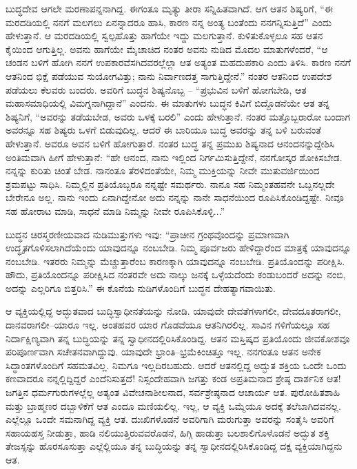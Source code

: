 ಬುದ್ಧದೇವ ಆಗಲೇ ಮರಣಾಪನ್ನನಾಗಿದ್ದ. ಈಗಂತೂ ಮೃತ್ಯು ತೀರಾ ಸನ್ನಿಹಿತವಾಗಿದೆ. ಆಗ ಆತನ ಶಿಷ್ಯರಿಗೆ, “ಈ ಮರದಡಿಯಲ್ಲಿ ನನಗೆ ಮಲಗಲು ಏನನ್ನಾದರೂ ಹಾಸಿ, ಕಾರಣ ನನ್ನ ಅಂತ್ಯ ಬಂತೆಂದು ನನಗನ್ನಿಸುತ್ತಿದೆ” ಎಂದು ಹೇಳುತ್ತಾನೆ. ಆ ಮರದಡಿಯಲ್ಲಿ ಸ್ವಲ್ಪಹೊತ್ತು ಹಾಗೆಯೇ ಇದ್ದು ಮಲಗುತ್ತಾನೆ. ಕುಳಿತುಕೊಳ್ಳಲೂ ಸಹ ಆತನ ಕೈಯಿಂದ ಆಗುತ್ತಿಲ್ಲ. ಅವನು ಹಾಗೆಯೇ ಮೈಚಾಚಿದ ನಂತರ ಅವನು ನುಡಿದ ಮೊದಲ ಮಾತುಗಳೆಂದರೆ, “ಆ ಚಂಡನ ಬಳಿಗೆ ಹೋಗಿ ನನಗೆ ಉಪಕಾರವೆಸಗಿದವರಲ್ಲೆಲ್ಲಾ ಆತ ಅತ್ಯಂತ ಮಹದುಪಕಾರಿ ಎಂದು ತಿಳಿಸಿ. ಕಾರಣ ನನಗೆ ಆತನಿಂದ ಭಿಕ್ಷೆ ಪಡೆಯುವ ಸುಯೋಗವಿತ್ತು; ನಾನು ನಿರ್ವಾಣದತ್ತ ಸಾಗುತ್ತಿದ್ದೇನೆ.” ನಂತರ ಆತನಿಂದ ಉಪದೇಶ ಪಡೆಯಲು ಕೆಲವರು ಬಂದರು. ಅವರಿಗೆ ಬುದ್ಧನ ಶಿಷ್ಯನೊಬ್ಬ – “ಪ್ರಭುವಿನ ಬಳಿಗೆ ಹೋಗಬೇಡಿ, ಆತ ಮಹಾಸಮಾಧಿಯಲ್ಲಿ ವಿಮಗ್ನನಾಗಿದ್ದಾನೆ” ಎಂದನು. ಈ ಮಾತುಗಳು ಬುದ್ಧನ ಕಿವಿಗೆ ಬಿದ್ದೊಡನೆಯೇ ಆತ ತನ್ನ ಶಿಷ್ಯನಿಗೆ, “ಅವರನ್ನು ತಡೆಯಬೇಡ, ಅವರು ಒಳಕ್ಕೆ ಬರಲಿ” ಎಂದು ಹೇಳುತ್ತಾನೆ. ನಂತರ ಮತ್ತೊಬ್ಬರಾರೋ ಬಂದಾಗ ಅವರನ್ನೂ ಸಹ ಶಿಷ್ಯರು ಒಳಗೆ ಬಿಡುವುದಿಲ್ಲ. ಆದರೆ ಈ ಬಾರಿಯೂ ಬುದ್ಧ ಅವರನ್ನು ತನ್ನ ಬಳಿ ಬರುವಂತೆ ಹೇಳುತ್ತಾನೆ. ಅವರೂ ಅವನ ಬಳಿಗೆ ಹೋಗುತ್ತಾರೆ. ನಂತರ ಬುದ್ಧ ತನ್ನ ಪ್ರಮುಖ ಶಿಷ್ಯನಾದ ಆನಂದನನ್ನುದ್ದೇಶಿಸಿ ಅಂತಿಮವಾಗಿ ಹೀಗೆ ಹೇಳುತ್ತಾನೆ: “ಹೇ ಆನಂದ, ನಾನು ಇಲ್ಲಿಂದ ನಿರ್ಗಮಿಸುತ್ತಿದ್ದೇನೆ, ನನಗೋಸ್ಕರ ಶೋಕಿಸಬೇಡ. ನನ್ನನ್ನು ಕುರಿತು ಚಿಂತೆ ಬೇಡ. ನಾನಂತೂ ತೆರಳಿದಂತೆಯೇ, ನಿಮ್ಮ ಮುಕ್ತಿಯನ್ನು ನೀವೇ ಮುತುವರ್ಜಿಯಿಂದ ಶ್ರಮಪಟ್ಟು ಸಾಧಿಸಿ. ನಿಮ್ಮಲ್ಲಿನ ಪ್ರತಿಯೊಬ್ಬರೂ ನನ್ನಷ್ಟೇ ಸಮರ್ಥರು. ನಾನೂ ಸಹ ನಿಮ್ಮಂತಹವನೇ ಒಬ್ಬನಲ್ಲದೇ ಬೇರೇನೂ ಅಲ್ಲ. ನಾನು ಇಂದು ಏನಾಗಿದ್ದೇನೋ ಅದು ನನ್ನನ್ನು ನಾನೇ ಸಾಧನೆಯಿಂದ ರೂಪಿಸಿಕೊಂಡಿದ್ದಷ್ಟೇ. ನೀವೂ ಸಹ ಹೋರಾಟ ಮಾಡಿ, ಸಾಧನೆ ಮಾಡಿ ನಿಮ್ಮನ್ನು ನೀವೇ ರೂಪಿಸಿಕೊಳ್ಳಿ...”

ಬುದ್ಧನ ಚಿರಸ್ಮರಣೀಯವಾದ ನುಡಿಮುತ್ತುಗಳು ಇವು: “ಪ್ರಾಚೀನ ಗ್ರಂಥವೊಂದನ್ನು ಪ್ರಮಾಣವಾಗಿ ಉದ್ಧೃತಗೊಳಿಸಲಾಗಿದೆಯೆಂದು ಯಾವುದನ್ನೂ ನಂಬಬೇಡಿ. ನಿಮ್ಮ ಪೂರ್ವಜರು ಹೇಳಿದ್ದಾರೆಂದ ಮಾತ್ರಕ್ಕೆ ಯಾವುದನ್ನೂ ನಂಬಬೇಡಿ. ಇತರರು ನಿಮ್ಮನ್ನು ಮೆಚ್ಚುತ್ತಾರೆಂಬ ಕಾರಣಕ್ಕಾಗಿ ಯಾವುದನ್ನೂ ನಂಬಬೇಡಿ. ಪ್ರತಿಯೊಂದನ್ನು ಪರೀಕ್ಷಿಸಿ. ಹೌದು, ಪ್ರತಿಯೊಂದನ್ನೂ ಪರೀಕ್ಷಿಸಿದ ನಂತರವೇ ಅದು ನಾಲ್ಕು ಜನಕ್ಕೆ ಒಳ್ಳೆಯದೆಂದು ಕಂಡುಬಂದರೆ ಅದನ್ನು ನಂಬಿ, ಅದನ್ನು ಎಲ್ಲರಿಗೂ ಬಿತ್ತರಿಸಿ.” ಈ ಕೊನೆಯ ನುಡಿಗಳೊಂದಿಗೆ ಬುದ್ಧನ ದೇಹತ್ಯಾಗವಾಯಿತು.

ಆ ವ್ಯಕ್ತಿಯಲ್ಲಿದ್ದ ಅದ್ಭುತವಾದ ಬುದ್ಧಿಸ್ವಾಧೀನತೆಯನ್ನು ನೋಡಿ. ಯಾವುದೇ ದೇವತೆಗಳಾಗಲೀ, ದೇವದೂತರಾಗಲೀ, ದಾನವರಾಗಲೀ–ಯಾರೂ ಇಲ್ಲ. ಅಂತಹವರ ಯಾರ ಗೊಡವೆಯೂ ಆತನಿಗಿರಲಿಲ್ಲ. ಸಾವಿನ ಗಳಿಗೆಯಲ್ಲೂ ಸಹ ನಿರ್ದಾಕ್ಷಿಣ್ಯವಾಗಿ ತನ್ನ ಬುದ್ಧಿಯನ್ನು ತನ್ನ ಸ್ವಾಧೀನದಲ್ಲಿರಿಸಿಕೊಂಡಿದ್ದ. ಆತನ ಮಸ್ತಿಷ್ಕದ ಪ್ರತಿಯೊಂದು ಜೀವಕೋಶವೂ ಪರಿಪೂರ್ಣವಾಗಿ ಸಚೇತನವಾಗಿದ್ದುವು. ಯಾವುದೇ ಭ್ರಾಂತಿ–ಭ್ರಮೆಕಿಂಚಿತ್ತೂ ಇಲ್ಲ. ನನಗಂತೂ ಆತನ ಅನೇಕ ಸಿದ್ಧಾಂತಗಳೊಂದಿಗೆ ಸಹಮತವಿಲ್ಲ. ನಿಮಗೂ ಇಲ್ಲದಿರಬಹುದು. ಆದರೆ ಆತನಲ್ಲಿದ್ದ ಅದ್ಭುತ ಶಕ್ತಿಯ ಒಂದೇ ಒಂದು ಕಣವಾದರೂ ನನ್ನಲ್ಲಿದ್ದಿದ್ದರೆ ಎಂದೆನಿಸುತ್ತದೆ! ನಿಸ್ಸಂದೇಹವಾಗಿ ಜಗತ್ತು ಕಂಡ ಅಪ್ರತಿಮನಾದ ಶ್ರೇಷ್ಠ ದಾರ್ಶನಿಕ ಆತ! ಜಗತ್ತಿನ ಧರ್ಮಗುರುಗಳಲ್ಲೆಲ್ಲ ಅತ್ಯಂತ ವಿವೇಚನಾಶೀಲನಾದ, ಸರ್ವಶ್ರೇಷ್ಠನಾದ ಆಚಾರ್ಯ ಆತ. ಪುರೋಹಿತಶಾಹಿ ಮತ್ತು ಬ್ರಾಹ್ಮಣರ ದಬ್ಬಾಳಿಕೆಗೆ ಆತ ಎಂದೂ ಮಣಿಯಲಿಲ್ಲ. ಇಲ್ಲ, ಆ ವ್ಯಕ್ತಿ ಒಮ್ಮೆಯೂ ಅದಕ್ಕೆ ತಲೆಬಾಗಿದವನಲ್ಲ. ಎಲ್ಲೆಲ್ಲೂ ಒಂದೇ ಸಮನಾಗಿದ್ದ ವ್ಯಕ್ತಿ ಆತ. ದುಃಖಿಗಳೊಡನೆ ಅವರಿಗಾಗಿ ಮರುಗುತ್ತಾ ಅವರನ್ನು ಸಂತೈಸಿ ಅವರಿಗೆ ಸಹಾಯಹಸ್ತ ನೀಡುತ್ತಾ, ಹಾಡಿ ನಲಿಯುತ್ತಿರುವವರೊಡನೆ, ಹಿಗ್ಗಿ ಹಾಡುತ್ತಾ ಬಲಶಾಲಿಗೊಳೊಡನೆ ಅದ್ಭುತ ಶಕ್ತಿ ತೇಜಸ್ಸನ್ನು ಹೊರಸೂಸುತ್ತಾ ಎಲ್ಲೆಲ್ಲಿಯೂ ತನ್ನ ಬುದ್ಧಿಯನ್ನು ತನ್ನ ಸ್ವಾಧೀನದಲ್ಲಿರಿಸಿಕೊಂಡಿದ್ದ ದಕ್ಷ ವ್ಯಕ್ತಿಯಾಗಿದ್ದನು ಆತ.

